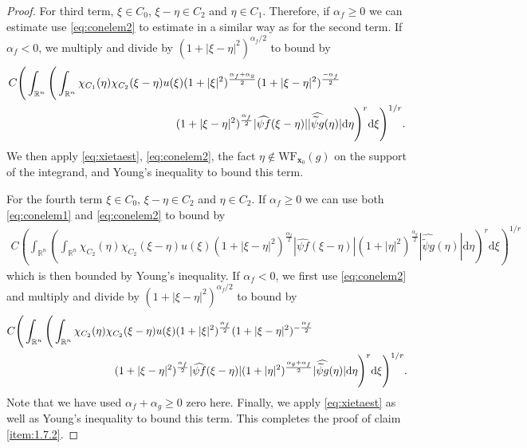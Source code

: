 \documentclass[a4paper,12pt]{amsart}
\numberwithin{equation}{section}
\theoremstyle{plain}
\numberwithin{theorem}{section}
\theoremstyle{definition}
\theoremstyle{remark}
\theoremstyle{remark}
\theoremstyle{remark}
\newcommand{\dd}{\mathrm{d}}  %
\newcommand{\WF}{\mathrm{WF}}                         %
\newcommand{\vx}{{\mathbf{x}}}
\begin{document}
\begin{proof}
    For third term, $\xi \in C_0$, $\xi - \eta \in C_2$ and $\eta \in C_1$. Therefore, if $\alpha_f \geq 0$ we can estimate use \eqref{eq:conelem2} to estimate in a similar way as for the second term. If $\alpha_f <0$, we multiply and divide by $(1+|\xi-\eta|^2)^{\alpha_f/2}$ to bound by
    \[
    \begin{split}&
     C \Bigg (\int_{\mathbb{R}^n} \Bigg ( \int_{\mathbb{R}^n}\chi_{C_1}(\eta) \chi_{C_2}(\xi-\eta) u(\xi) (1+|\xi|^2)^{\frac{\alpha_f + \alpha_g}{2}} (1+|\xi-\eta|^2)^{\frac{-\alpha_f}{2}}\\
     &\hskip15em (1+|\xi-\eta|^2)^{\frac{\alpha_f}{2}}|\widehat{\psi f}(\xi-\eta)| |\widehat{\widetilde{\psi} g}(\eta)| \dd \eta \Bigg )^r \dd \xi \Bigg )^{1/r}.
     \end{split}
    \]
    We then apply \eqref{eq:xietaest}, \eqref{eq:conelem2}, the fact $\eta \notin \WF_{\vx_0}(g)$ on the support of the integrand, and Young's inequality to bound this term.

    For the fourth term $\xi \in C_0$, $\xi - \eta \in C_2$ and $\eta \in C_2$. If $\alpha_f \geq 0$ we can use both \eqref{eq:conelem1} and \eqref{eq:conelem2} to bound by
    \[
    \begin{split}
    C \left (\int_{\mathbb{R}^n} \left ( \int_{\mathbb{R}^n}\chi_{C_2}(\eta) \chi_{C_2}(\xi-\eta) u(\xi) (1+|\xi-\eta|^2)^{\frac{\alpha_f}{2}} |\widehat{\psi f}(\xi-\eta)|  (1+|\eta|^2)^{\frac{\alpha_g}{2}} |\widehat{\widetilde{\psi} g}(\eta)| \dd \eta \right )^r \dd \xi \right )^{1/r}
    \end{split}
    \]
    which is then bounded by Young's inequality. If $\alpha_f<0$, we first use \eqref{eq:conelem2} and multiply and divide by $(1+|\xi-\eta|^2)^{\alpha_f/2}$ to bound by
        \[
    \begin{split}
    & C \Bigg (\int_{\mathbb{R}^n} \Bigg ( \int_{\mathbb{R}^n}\chi_{C_2}(\eta) \chi_{C_2}(\xi-\eta) u(\xi) (1+|\xi|^2)^{\frac{\alpha_f}{2}} (1+|\xi-\eta|^2)^{-\frac{\alpha_f}{2}}\\
    & \hskip10em (1+|\xi-\eta|^2)^{\frac{\alpha_f}{2}}|\widehat{\psi f}(\xi-\eta)|  (1+|\eta|^2)^{\frac{\alpha_g+\alpha_f}{2}} |\widehat{\widetilde{\psi} g}(\eta)| \dd \eta \Bigg )^r \dd \xi \Bigg )^{1/r}.
    \end{split}
    \]
    Note that we have used $\alpha_f+\alpha_g \geq 0$ zero here. Finally, we apply \eqref{eq:xietaest} as well as Young's inequality to bound this term. This completes the proof of claim \eqref{item:1.7.2}.


\end{proof}
\end{document}
